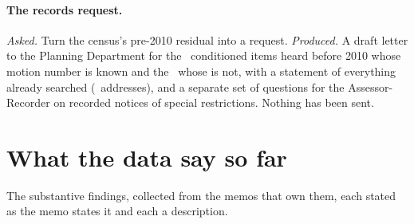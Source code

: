 \documentclass[11pt]{article}
\begin{document}
\paragraph{The records request.} \textit{Asked.} Turn the census's pre-2010 residual into a
request. \textit{Produced.} A draft letter to the Planning Department for the \chRrWith\
conditioned items heard before 2010 whose motion number is known and the \chRrWithout\ whose is
not, with a statement of everything already searched (\ccProbed\ addresses), and a separate set
of questions for the Assessor-Recorder on recorded notices of special restrictions. Nothing has
been sent.

\section{What the data say so far}\label{sec:chfindings}

The substantive findings, collected from the memos that own them, each stated as the memo states
it and each a description.
\end{document}

